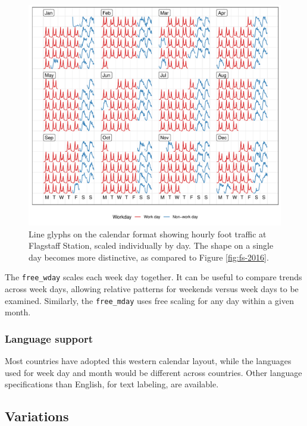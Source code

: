 \documentclass[12pt]{article}
\begin{document}
\begin{figure}

{\centering \includegraphics[width=\textwidth]{figure/fs-free-1} 

}

\caption{Line glyphs on the calendar format showing hourly foot traffic at Flagstaff Station, scaled individually by day. The shape on a single day becomes more distinctive, as compared to Figure \ref{fig:fs-2016}.}\label{fig:fs-free}
\end{figure}



The \texttt{free\_wday} scales each week day together. It can be useful to compare trends across week days, allowing relative patterns for weekends versus week days to be examined. Similarly, the \texttt{free\_mday} uses free scaling for any day within a given month.

\hypertarget{language-support}{%
\subsubsection{Language support}\label{language-support}}

Most countries have adopted this western calendar layout, while the languages used for week day and month would be different across countries. Other language specifications than English, for text labeling, are available.

\hypertarget{sec:variations}{%
\subsection{Variations}\label{sec:variations}}
\end{document}
